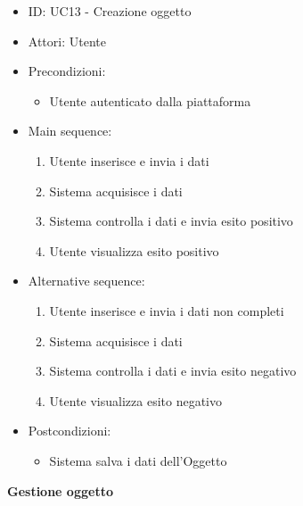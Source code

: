 \documentclass{article}
\begin{document}
\begin{itemize}[label = {-}]
    \itemsep0px
    \item ID: UC13 - Creazione oggetto
    \item Attori: Utente
    \item Precondizioni: 
        \begin{itemize}[label = {-}]
            \item Utente autenticato dalla piattaforma
        \end{itemize}
    \item Main sequence: 
        \begin{enumerate}
            \item Utente inserisce e invia i dati
            \item Sistema acquisisce i dati
            \item Sistema controlla i dati e invia esito positivo
            \item Utente visualizza esito positivo
        \end{enumerate}
    \item Alternative sequence:
        \begin{enumerate}
            \item Utente inserisce e invia i dati non completi
            \item Sistema acquisisce i dati
            \item Sistema controlla i dati e invia esito negativo
            \item Utente visualizza esito negativo
        \end{enumerate}
    \item Postcondizioni: 
        \begin{itemize}[label = {-}]
            \item Sistema salva i dati dell'Oggetto
        \end{itemize}
\end{itemize}
\textbf{Gestione oggetto}
\end{document}
